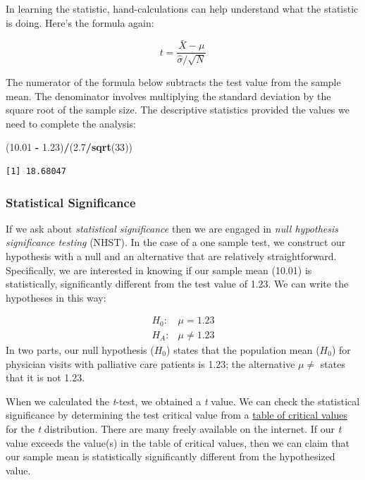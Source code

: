 \documentclass[
  11pt,
]{book}
\newenvironment{Shaded}{\begin{snugshade}}{\end{snugshade}}
\newcommand{\DecValTok}[1]{\textcolor[rgb]{0.06,0.06,0.06}{#1}}
\newcommand{\FloatTok}[1]{\textcolor[rgb]{0.06,0.06,0.06}{#1}}
\newcommand{\FunctionTok}[1]{\textcolor[rgb]{0.27,0.27,0.27}{\textbf{#1}}}
\newcommand{\NormalTok}[1]{#1}
\newcommand{\SpecialCharTok}[1]{\textcolor[rgb]{0.43,0.43,0.43}{\textbf{#1}}}
\begin{document}
In learning the statistic, hand-calculations can help understand what the statistic is doing. Here's the formula again:

\[
t = \frac{\bar{X} - \mu}{\hat{\sigma}/\sqrt{N} }
\]

The numerator of the formula below subtracts the test value from the sample mean. The denominator involves multiplying the standard deviation by the square root of the sample size. The descriptive statistics provided the values we need to complete the analysis:

\begin{Shaded}
\begin{Highlighting}[]
\NormalTok{(}\FloatTok{10.01} \SpecialCharTok{{-}} \FloatTok{1.23}\NormalTok{)}\SpecialCharTok{/}\NormalTok{(}\FloatTok{2.7}\SpecialCharTok{/}\FunctionTok{sqrt}\NormalTok{(}\DecValTok{33}\NormalTok{))}
\end{Highlighting}
\end{Shaded}

\begin{verbatim}
[1] 18.68047
\end{verbatim}

\hypertarget{statistical-significance}{%
\subsubsection{Statistical Significance}\label{statistical-significance}}

If we ask about \emph{statistical significance} then we are engaged in \emph{null hypothesis significance testing} (NHST). In the case of a one sample test, we construct our hypothesis with a null and an alternative that are relatively straightforward. Specifically, we are interested in knowing if our sample mean (10.01) is statistically, significantly different from the test value of 1.23. We can write the hypotheses in this way:

\[
\begin{array}{ll}
H_0: & \mu = 1.23 \\
H_A: & \mu \neq 1.23
\end{array}
\] In two parts, our null hypothesis (\(H_0\)) states that the population mean (\(H_0\)) for physician visits with palliative care patients is 1.23; the alternative \(\mu \neq\) states that it is not 1.23.

When we calculated the \emph{t}-test, we obtained a \emph{t} value. We can check the statistical significance by determining the test critical value from a \href{https://www.statology.org/t-distribution-table/}{table of critical values} for the \emph{t} distribution. There are many freely available on the internet. If our \emph{t} value exceeds the value(s) in the table of critical values, then we can claim that our sample mean is statistically significantly different from the hypothesized value.
\end{document}
